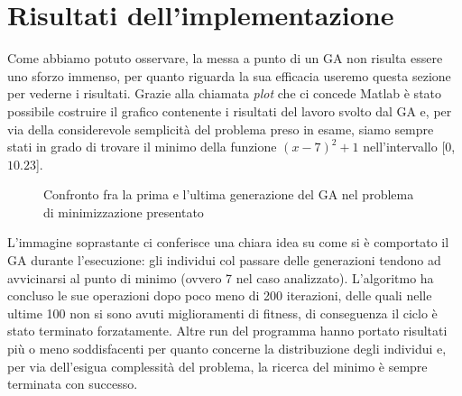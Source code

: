 \section{Risultati dell'implementazione}
Come abbiamo potuto osservare, la messa a punto di un GA non risulta essere uno sforzo immenso, per quanto riguarda la sua efficacia useremo questa sezione per vederne i risultati. Grazie alla chiamata \textit{plot} che ci concede Matlab \`e stato possibile costruire il grafico contenente i risultati del lavoro svolto dal GA e, per via della considerevole semplicit\`a del problema preso in esame, siamo sempre stati in grado di trovare il minimo della funzione $(x-7)^2+1$ nell'intervallo [$0$, $10.23$].
\begin{figure}[H]%
    \centering
    \caption{Confronto fra la prima e l'ultima generazione del GA nel problema di minimizzazione presentato}%
    \label{fig:firstfunction}%
\end{figure}
L'immagine soprastante ci conferisce una chiara idea su come si \`e comportato il GA durante l'esecuzione: gli individui col passare delle generazioni tendono ad avvicinarsi al punto di minimo (ovvero 7 nel caso analizzato). L'algoritmo ha concluso le sue operazioni dopo poco meno di 200 iterazioni, delle quali nelle ultime 100 non si sono avuti miglioramenti di fitness, di conseguenza il ciclo \`e stato terminato forzatamente. Altre run del programma hanno portato risultati pi\`u o meno soddisfacenti per quanto concerne la distribuzione degli individui e, per via dell'esigua complessit\`a del problema, la ricerca del minimo \`e sempre terminata con successo.
